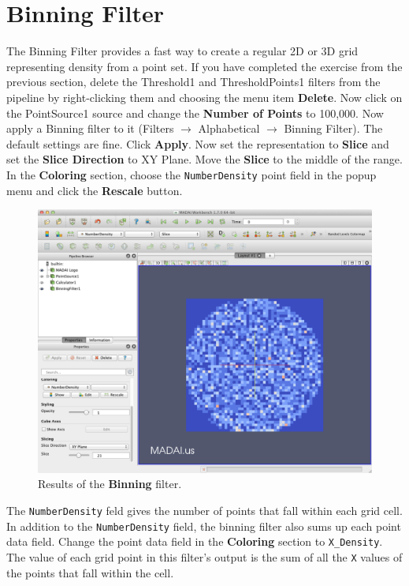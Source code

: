 \documentclass[12pt]{article}
\begin{document}
\section{Binning Filter}

The Binning Filter provides a fast way to create a regular 2D or 3D grid representing density from a point set. If you have completed the exercise from the previous section, delete the Threshold1 and ThresholdPoints1 filters from the pipeline by right-clicking them and choosing the menu item \textbf{Delete}. Now click on the PointSource1 source and change the \textbf{Number of Points} to 100,000. Now apply a Binning filter to it (Filters $\rightarrow$ Alphabetical $\rightarrow$ Binning Filter). The default settings are fine. Click \textbf{Apply}. Now set the representation to \textbf{Slice} and set the \textbf{Slice Direction} to XY Plane. Move the \textbf{Slice} to the middle of the range. In the \textbf{Coloring} section, choose the \texttt{NumberDensity} point field in the popup menu and click the \textbf{Rescale} button.

\begin{figure}[htbp]
   \centering
   \includegraphics[scale=.25]{images/BinningFilter.png} %
   \caption{Results of the \textbf{Binning} filter.}
   \label{fig:BinningFilter}
\end{figure}

The \texttt{NumberDensity} feld gives the number of points that fall within each grid cell. In addition to the \texttt{NumberDensity} field, the binning filter also sums up each point data field. Change the point data field in the \textbf{Coloring} section to \texttt{X\_Density}. The value of each grid point in this filter's output is the sum of all the \texttt{X} values of the points that fall within the cell.
\end{document}
